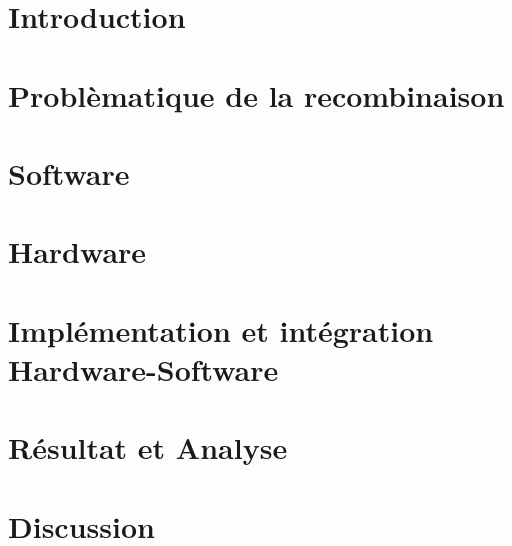 \documentclass[
    iai, %
    eai, %
]{heig-tb}
\begin{document}
\maketitle
\frontmatter
\clearemptydoublepage

\preamble
\authentification

\begin{abstract}
    
\end{abstract}

\clearemptydoublepage
{
    \tableofcontents
    \let\cleardoublepage\clearpage
    \listoffigures
    \let\cleardoublepage\clearpage
    \listoftables
    \let\cleardoublepage\clearpage
    \listoflistings
}

\printnomenclature
\clearemptydoublepage
{}

\mainmatter
\chapter{Introduction}



\chapter{Problèmatique de la recombinaison}

\chapter{Software}


\chapter{Hardware}


\chapter{Implémentation et intégration Hardware-Software}


\chapter{Résultat et Analyse}


\chapter{Discussion}
\end{document}
